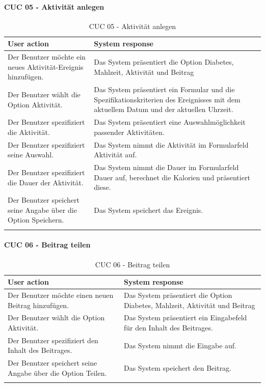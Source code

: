 \paragraph{CUC 05 - Aktivität anlegen}
\begin{center}
	\begin{longtable}[H]{|p{6cm}|p{6cm}|}
		\hline
		\textbf{User action} & \textbf{System response}\\
		\hline
		Der Benutzer möchte ein neues Aktivität-Ereignis hinzufügen. & Das System präsentiert die Option \glqq Diabetes\grqq{}, \glqq Mahlzeit\grqq{}, \glqq Aktivität\grqq{} und \glqq Beitrag\grqq{}\\
		\hline
		Der Benutzer wählt die Option \glqq Aktivität\grqq{}. & Das System präsentiert ein Formular und die Spezifikationskriterien des Ereignisses mit dem aktuellem Datum und der aktuellen Uhrzeit.\\
		\hline
		Der Benutzer spezifiziert die Aktivität. & Das System präsentiert eine Auswahlmöglichkeit passender Aktivitäten.\\
		\hline
		Der Benutzer spezifiziert seine Auswahl. & Das System nimmt die Aktivität im Formularfeld \glqq Aktivität\grqq{} auf.\\
		\hline
		Der Benutzer spezifiziert die Dauer der Aktivität. & Das System nimmt die Dauer im Formularfeld \glqq Dauer\grqq{} auf, berechnet die Kalorien und präsentiert diese.\\
		\hline
		Der Benutzer speichert seine Angabe über die Option \glqq Speichern\grqq{}. & Das System speichert das Ereignis.\\
		\hline
		\captionsetup{justification=centering}
		\caption{CUC 05 - Aktivität anlegen}
		\label{tab:Persona Use Cases 5}
	\end{longtable}
\end{center}
\paragraph{CUC 06 - Beitrag teilen}
\begin{center}
\begin{longtable}[H]{|p{6cm}|p{6cm}|}
	\hline
	\textbf{User action} & \textbf{System response}\\
	\hline
	Der Benutzer möchte einen neuen Beitrag hinzufügen. & Das System präsentiert die Option \glqq Diabetes\grqq{}, \glqq Mahlzeit\grqq{}, \glqq Aktivität\grqq{} und \glqq Beitrag\grqq{}\\
	\hline
	Der Benutzer wählt die Option \glqq Aktivität\grqq{}. & Das System präsentiert ein Eingabefeld für den Inhalt des Beitrages.\\
	\hline
	Der Benutzer spezifiziert den Inhalt des Beitrages. & Das System nimmt die Eingabe auf.\\
	\hline
	Der Benutzer speichert seine Angabe über die Option \glqq Teilen\grqq{}. & Das System speichert den Beitrag.\\
	\hline
	\captionsetup{justification=centering}
	\caption{CUC 06 - Beitrag teilen}
	\label{tab:Persona Use Cases 6}
\end{longtable}
\end{center}